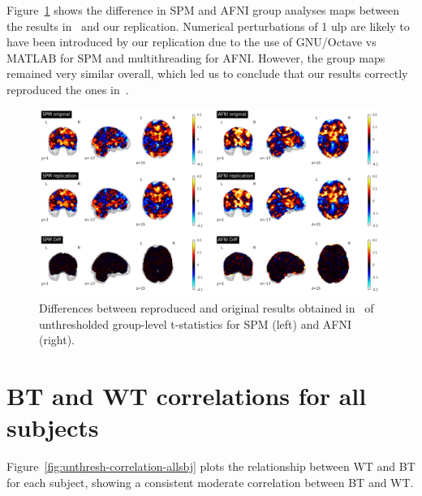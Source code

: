 \documentclass[11pt,onecolumn]{article}
\begin{document}
Figure~\ref{fig:replication-diff} shows the difference in SPM and AFNI
group analyses maps between the results in~\cite{bowring2019exploring} and
our replication. Numerical perturbations of 1 ulp are likely to have been
introduced by our replication due to the use of GNU/Octave vs MATLAB for SPM
and multithreading for AFNI. However, the group maps remained very similar
overall, which led us to conclude that our results correctly reproduced 
the ones in~\cite{bowring2019exploring}.
\begin{figure}[ht]
  \includegraphics[width=\textwidth]{figures/replication-diffs.png}
  \caption{Differences between reproduced and original results obtained in~\cite{bowring2019exploring} 
  of unthresholded group-level t-statistics for SPM (left) and AFNI (right).}
  \label{fig:replication-diff}
\end{figure}

\section{BT and WT correlations for all subjects}
\label{sec:supp-subjects}

Figure~\ref{fig:unthresh-correlation-allsbj} plots the relationship between
WT and BT for each subject, showing a consistent moderate correlation between BT and
WT.
\end{document}
